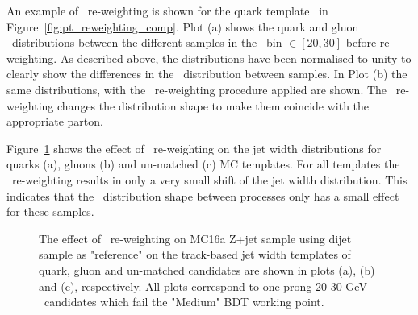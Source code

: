 	An example of \pt\ re-weighting is shown for the quark template \pt\ in Figure~\ref{fig:pt_reweighting_comp}. Plot (a) shows the quark and gluon \pt\ distributions between the different samples in the \pt\ bin $\in[20,30]$ before re-weighting. As described above, the distributions have been normalised to unity to clearly show the differences in the \pt\ distribution between samples. In Plot (b) the same distributions, with the \pt\ re-weighting procedure applied are shown. The \pt\ re-weighting changes the distribution shape to make them coincide with the appropriate parton. 
	
	Figure~\ref{fig:qgu_jetwidth_reweighting} shows the effect of \pt\ re-weighting on the jet width distributions for quarks (a), gluons (b) and un-matched (c) MC templates. For all templates the \pt\ re-weighting results in only a very small shift of the jet width distribution. This indicates that the \pt\ distribution shape between processes only has a small effect for these samples.
	\begin{figure}[!hbt]
	\begin{center}
			\hspace{0.03\textwidth}
			\hspace{0.03\textwidth}
			\hspace{0.03\textwidth}
		\end{center}
		\caption{The effect of \pt\ re-weighting on MC16a Z+jet sample using dijet sample as "reference" on the track-based jet width templates of quark, gluon and un-matched candidates are shown in plots (a), (b) and (c), respectively. All plots correspond to one prong 20-30 GeV \htau\ candidates which fail the "Medium" \ac{BDT} working point. }
	\label{fig:qgu_jetwidth_reweighting}
	\end{figure}		
	
